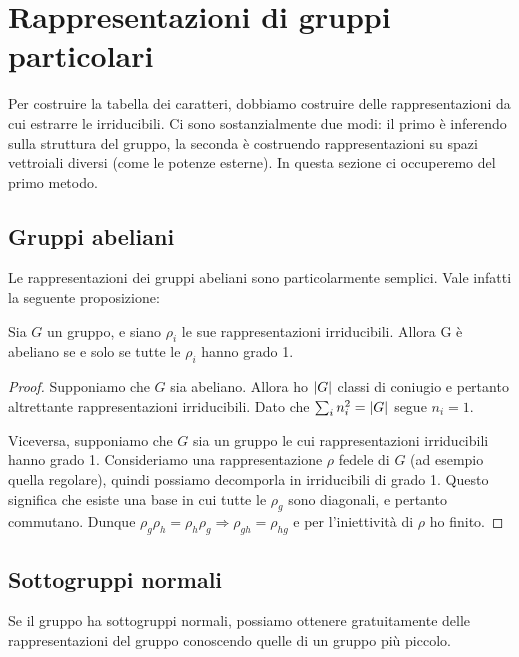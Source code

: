   \section{Rappresentazioni di gruppi particolari}
   Per costruire la tabella dei caratteri, dobbiamo costruire delle rappresentazioni da cui estrarre le irriducibili. Ci sono sostanzialmente due modi: il primo è inferendo sulla struttura del gruppo, la seconda è costruendo rappresentazioni su spazi vettroiali diversi (come le potenze esterne). In questa sezione ci occuperemo del primo metodo.
  
  \subsection{Gruppi abeliani}
   Le rappresentazioni dei gruppi abeliani sono particolarmente semplici. Vale infatti la seguente proposizione:
   \begin{myprop}
    Sia $G$ un gruppo, e siano $\rho_i$ le sue rappresentazioni irriducibili. Allora G è abeliano se e solo se tutte le $\rho_i$ hanno grado 1.
   \end{myprop}
    
   \begin{proof}
    Supponiamo che $G$ sia abeliano. Allora ho $\left|G\right|$ classi di coniugio e pertanto altrettante rappresentazioni irriducibili. Dato che $\sum_i n_i^2 = \left|G\right|$ segue $n_i = 1$.
    
    Viceversa, supponiamo che $G$ sia un gruppo le cui rappresentazioni irriducibili hanno grado 1. Consideriamo una rappresentazione $\rho$ fedele di $G$ (ad esempio quella regolare), quindi possiamo decomporla in irriducibili di grado 1. Questo significa che esiste una base in cui tutte le $\rho_g$ sono diagonali, e pertanto commutano. Dunque $\rho_g\rho_h = \rho_h\rho_g \Rightarrow \rho_{gh} = \rho_{hg}$ e per l'iniettività di $\rho$ ho finito.
   \end{proof}
  \subsection{Sottogruppi normali}
    Se il gruppo ha sottogruppi normali, possiamo ottenere gratuitamente delle rappresentazioni del gruppo conoscendo quelle di un gruppo più piccolo.
    
